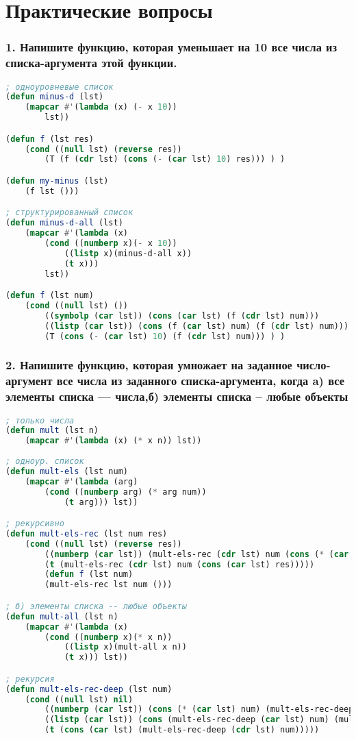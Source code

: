 \section*{Практические вопросы}


\subsubsection*{1. Напишите функцию, которая уменьшает на 10 все числа из списка-аргумента этой функции.}
\begin{lstlisting}[language=Lisp]
; одноуровневые список
(defun minus-d (lst)
	(mapcar #'(lambda (x) (- x 10))
		lst))

(defun f (lst res)
	(cond ((null lst) (reverse res))
		(T (f (cdr lst) (cons (- (car lst) 10) res))) ) )

(defun my-minus (lst)
	(f lst ()))

; структурированный список
(defun minus-d-all (lst)
	(mapcar #'(lambda (x) 
		(cond ((numberp x)(- x 10))
			((listp x)(minus-d-all x))
			(t x)))
		lst))

(defun f (lst num)
	(cond ((null lst) ())
		((symbolp (car lst)) (cons (car lst) (f (cdr lst) num)))
		((listp (car lst)) (cons (f (car lst) num) (f (cdr lst) num)))
		(T (cons (- (car lst) 10) (f (cdr lst) num))) ) )
\end{lstlisting}

\newpage
\subsubsection*{2. Напишите функцию, которая умножает на заданное число-аргумент все числа из заданного списка-аргумента, когда \newline a) все элементы списка --- числа,\newline б) элементы списка -- любые объекты}

\begin{lstlisting}[language=Lisp]
; только числа
(defun mult (lst n)
	(mapcar #'(lambda (x) (* x n)) lst))
	
; одноур. список
(defun mult-els (lst num)
	(mapcar #'(lambda (arg)
		(cond ((numberp arg) (* arg num))
			(t arg))) lst)) 

; рекурсивно 
(defun mult-els-rec (lst num res)
	(cond ((null lst) (reverse res))
		((numberp (car lst)) (mult-els-rec (cdr lst) num (cons (* (car lst) num) res)))
		(t (mult-els-rec (cdr lst) num (cons (car lst) res)))))
		(defun f (lst num)
		(mult-els-rec lst num ()))

; б) элементы списка -- любые объекты
(defun mult-all (lst n)
	(mapcar #'(lambda (x) 
		(cond ((numberp x)(* x n))
			((listp x)(mult-all x n))
			(t x))) lst))

; рекурсия 
(defun mult-els-rec-deep (lst num)
	(cond ((null lst) nil)
		((numberp (car lst)) (cons (* (car lst) num) (mult-els-rec-deep (cdr lst) num)))
		((listp (car lst)) (cons (mult-els-rec-deep (car lst) num) (mult-els-rec-deep (cdr lst) num)))
		(t (cons (car lst) (mult-els-rec-deep (cdr lst) num)))))

\end{lstlisting}

